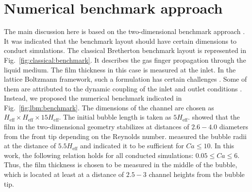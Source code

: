 \documentclass[preprint,12pt]{elsarticle}
\begin{document}
\section{Numerical benchmark approach}
\label{sec:numerical:benchmark}
The main discussion here is based on the two-dimensional benchmark approach
\cite{kuzmin-binary2d}. It was indicated that the benchmark layout should have certain
dimensions to conduct simulations. The classical Bretherton benchmark layout is represented in
Fig.~\ref{fig:classical:benchmark}. It describes the gas finger propagation through the liquid
medium.
The film thickness in this case is measured at the inlet. In the lattice Boltzmann framework, such a
formulation has certain challenges \cite{kuzmin-binary2d}. Some of them are attributed to the
dynamic coupling of the inlet and outlet conditions \cite{giavedoni-numerical}. Instead, we
proposed the numerical benchmark indicated in Fig.~\ref{fig:lbm:benchmark}. The dimensions of the
channel are chosen as $H_{\mathrm{eff}}\times H_{\mathrm{eff}} \times 15 H_{\mathrm{eff}}$. The
initial bubble length is taken as $5 H_{\mathrm{eff}}$. \citet{giavedoni-numerical} showed that
the film in the two-dimensional geometry stabilizes at distances of $2.6-4.0$ diameters
from the front tip depending on the Reynolds number. \citet{heil-threedim} measured the bubble radii
at the distance of $5.5 H_{\mathrm{eff}}$ and indicated it to be sufficient for $Ca\leq 10$. In
this work, the following relation holds for all conducted simulations: $0.05 \leq Ca \leq 6$.
Thus, the
film thickness is chosen to be measured in the
middle of the bubble, which is located at least at a distance of $2.5-3$ channel heights from the 
bubble tip.%
\end{document}
